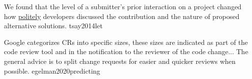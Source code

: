 \documentclass{article}
\begin{document}


  {We found that the level of a submitter's prior interaction on a project changed how \ul{politely} developers discussed the contribution and the nature of proposed alternative solutions.}
  {tsay2014let}

  {Google categorizes CRs into specific sizes, these sizes are indicated as part of the code review tool and in the notification to the reviewer of the code change... The general advice is to split change requests for easier and quicker reviews when possible.}
  {egelman2020predicting}


\end{document}
